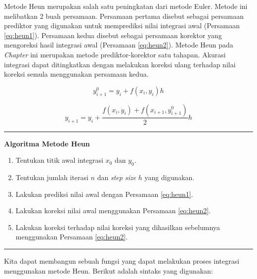 \documentclass[]{book}
\providecommand{\tightlist}{%
  \setlength{\itemsep}{0pt}\setlength{\parskip}{0pt}}
\theoremstyle{definition}
\theoremstyle{definition}
\theoremstyle{definition}
\theoremstyle{remark}
\begin{document}
Metode Heun merupakan salah satu peningkatan dari metode Euler. Metode ini melibatkan 2 buah persamaan. Persamaan pertama disebut sebagai persamaan prediktor yang digunakan untuk memprediksi nilai integrasi awal (Persamaan \eqref{eq:heun1}). Persamaan kedua disebut sebagai persamaan korektor yang mengoreksi hasil integrasi awal (Persamaan \eqref{eq:heun2}). Metode Heun pada \emph{Chapter} ini merupakan metode prediktor-korektor satu tahapan. Akurasi integrasi dapat ditingkatkan dengan melakukan koreksi ulang terhadap nilai koreksi semula menggunakan persamaan kedua.

\begin{equation}
y_{i+1}^{0}=y_i+f\left(x_i,y_i\right)h
  \label{eq:heun1}
\end{equation}

\begin{equation}
y_{i+1}=y_i+\frac{f\left(x_i,y_i\right)+f\left(x_{i+1},y_{i+1}^0\right)}{2}h
  \label{eq:heun2}
\end{equation}

\begin{center}\rule{0.5\linewidth}{\linethickness}\end{center}

\textbf{Algoritma Metode Heun}

\begin{enumerate}
\def\labelenumi{\arabic{enumi}.}
\tightlist
\item
  Tentukan titik awal integrasi \(x_0\) dan \(y_0\).
\item
  Tentukan jumlah iterasi \(n\) dan \emph{step size} \(h\) yang digunakan.
\item
  Lakukan prediksi nilai awal dengan Persamaan \eqref{eq:heun1}.
\item
  Lakukan koreksi nilai awal menggunakan Persamaan \eqref{eq:heun2}.
\item
  Lakukan koreksi terhadap nilai koreksi yang dihasilkan sebelumnya menggunakan Persamaan \eqref{eq:heun2}.
\end{enumerate}

\begin{center}\rule{0.5\linewidth}{\linethickness}\end{center}

Kita dapat membangun sebuah fungsi yang dapat melakukan proses integrasi menggunakan metode Heun. Berikut adalah sintaks yang digunakan:
\end{document}
